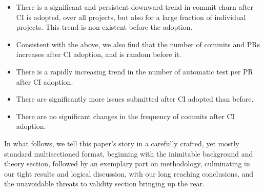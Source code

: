 \begin{itemize}

\item There is a significant and persistent downward trend in commit churn after CI is adopted, over all projects, but also for a large fraction of individual projects. This trend is non-existent before the adoption.

\item Consistent with the above, we also find that the number of commits and PRs increases after CI adoption, and is random before it.

\item There is a rapidly increasing trend in the number of automatic test per PR after CI adoption.

\item There are significantly more issues submitted after CI adopted than before.

\item There are no significant changes in the frequency of commits after CI adoption.
\end{itemize}


In what follows, we tell this paper's story in a carefully crafted, yet mostly standard multisectioned format, beginning with the inimitable background and theory section, followed by an exemplary part on methodology, culminating in our tight results and logical discussion, with our long reaching conclusions, and the unavoidable threats to validity section bringing up the rear.
